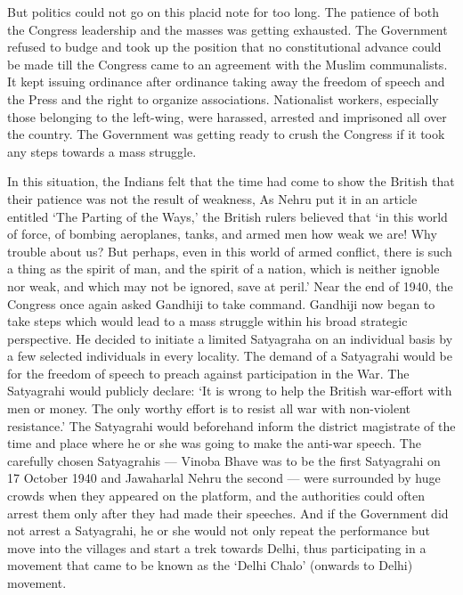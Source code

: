 \begin{multicols}{2}
But politics could not go on this placid note for too long. The patience of both the Congress leadership and the masses was getting exhausted. The Government refused to budge and took up the position that no constitutional advance could be made till the Congress came to an agreement with the Muslim communalists. It kept issuing ordinance after ordinance taking away the freedom of speech and the Press and the right to organize associations. Nationalist workers, especially those belonging to the left-wing, were harassed, arrested and imprisoned all over the country. The Government was getting ready to crush the Congress if it took any steps towards a mass struggle. 

In this situation, the Indians felt that the time had come to show the British that their patience was not the result of weakness, As Nehru put it in an article entitled `The Parting of the Ways,' the British rulers believed that `in this world of force, of bombing aeroplanes, tanks, and armed men how weak we are! Why trouble about us? But perhaps, even in this world of armed conflict, there is such a thing as the spirit of man, and the spirit of a nation, which is neither ignoble nor weak, and which may not be ignored, save at peril.' Near the end of 1940, the Congress once again asked Gandhiji to take command. Gandhiji now began to take steps which would lead to a mass struggle within his broad strategic perspective. He decided to initiate a limited Satyagraha on an individual basis by a few selected individuals in every locality. The demand of a Satyagrahi would be for the freedom of speech to preach against participation in the War. The Satyagrahi would publicly declare: `It is wrong to help the British war-effort with men or money. The only worthy effort is to resist all war with non-violent resistance.' The Satyagrahi would beforehand inform the district magistrate of the time and place where he or she was going to make the anti-war speech. The carefully chosen Satyagrahis --- Vinoba Bhave was to be the first Satyagrahi on 17 October 1940 and Jawaharlal Nehru the second --- were surrounded by huge crowds when they appeared on the platform, and the authorities could often arrest them only after they had made their speeches. And if the Government did not arrest a Satyagrahi, he or she would not only repeat the performance but move into the villages and start a trek towards Delhi, thus participating in a movement that came to be known as the `Delhi Chalo' (onwards to Delhi) movement. 


\end{multicols}
